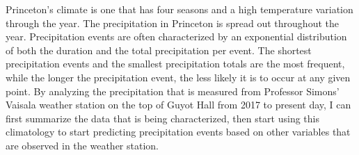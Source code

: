 

Princeton's climate is one that has four seasons and a high temperature variation through the year. The precipitation in Princeton is spread out throughout the year. Precipitation events are often characterized by an exponential distribution of both the duration and the total precipitation per event. The shortest precipitation events and the smallest precipitation totals are the most frequent, while the longer the precipitation event, the less likely it is to occur at any given point.  By analyzing the precipitation that is measured from Professor Simons' Vaisala weather station on the top of Guyot Hall from 2017 to present day, I can first summarize the data that is being characterized, then start using this climatology to start predicting precipitation events based on other variables that are observed in the weather station. 
